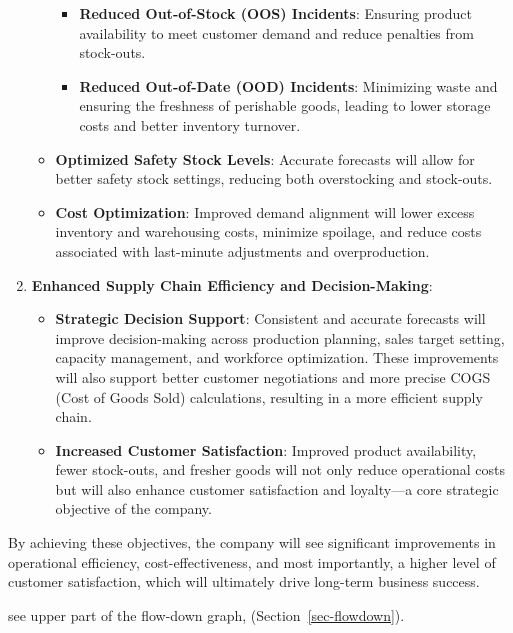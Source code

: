 \documentclass[
  american,
  10,
  a4paper,
]{book}
\providecommand{\tightlist}{%
  \setlength{\itemsep}{0pt}\setlength{\parskip}{0pt}}
\theoremstyle{definition}
\theoremstyle{remark}
\begin{document}
\begin{enumerate}
\begin{itemize}
    \begin{itemize}
    \tightlist
    \item
      \textbf{Reduced Out-of-Stock (OOS) Incidents}: Ensuring product
      availability to meet customer demand and reduce penalties from
      stock-outs.
    \item
      \textbf{Reduced Out-of-Date (OOD) Incidents}: Minimizing waste and
      ensuring the freshness of perishable goods, leading to lower
      storage costs and better inventory turnover.
    \end{itemize}
  \item
    \textbf{Optimized Safety Stock Levels}: Accurate forecasts will
    allow for better safety stock settings, reducing both overstocking
    and stock-outs.
  \item
    \textbf{Cost Optimization}: Improved demand alignment will lower
    excess inventory and warehousing costs, minimize spoilage, and
    reduce costs associated with last-minute adjustments and
    overproduction.
  \end{itemize}
\item
  \textbf{Enhanced Supply Chain Efficiency and Decision-Making}:

  \begin{itemize}
  \tightlist
  \item
    \textbf{Strategic Decision Support}: Consistent and accurate
    forecasts will improve decision-making across production planning,
    sales target setting, capacity management, and workforce
    optimization. These improvements will also support better customer
    negotiations and more precise COGS (Cost of Goods Sold)
    calculations, resulting in a more efficient supply chain.
  \item
    \textbf{Increased Customer Satisfaction}: Improved product
    availability, fewer stock-outs, and fresher goods will not only
    reduce operational costs but will also enhance customer satisfaction
    and loyalty---a core strategic objective of the company.
  \end{itemize}
\end{enumerate}

By achieving these objectives, the company will see significant
improvements in operational efficiency, cost-effectiveness, and most
importantly, a higher level of customer satisfaction, which will
ultimately drive long-term business success.

see upper part of the flow-down graph, (Section~\ref{sec-flowdown}).
\end{document}
